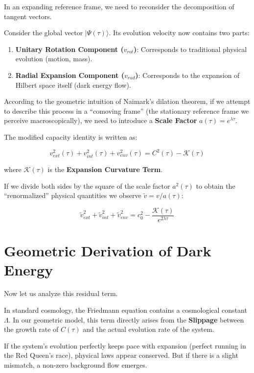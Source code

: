 In an expanding reference frame, we need to reconsider the decomposition of tangent vectors.

Consider the global vector $|\Psi(\tau)\rangle$. Its evolution velocity now contains two parts:

\begin{enumerate}
\item \textbf{Unitary Rotation Component ($v_{rot}$)}: Corresponds to traditional physical evolution (motion, mass).

\item \textbf{Radial Expansion Component ($v_{rad}$)}: Corresponds to the expansion of Hilbert space itself (dark energy flow).
\end{enumerate}

According to the geometric intuition of Naimark's dilation theorem, if we attempt to describe this process in a ``comoving frame'' (the stationary reference frame we perceive macroscopically), we need to introduce a \textbf{Scale Factor} $a(\tau) = e^{\lambda \tau}$.

The modified capacity identity is written as:

\[v_{ext}^2(\tau) + v_{int}^2(\tau) + v_{env}^2(\tau) = C^2(\tau) - \mathcal{K}(\tau)\]

where $\mathcal{K}(\tau)$ is the \textbf{Expansion Curvature Term}.

If we divide both sides by the square of the scale factor $a^2(\tau)$ to obtain the ``renormalized'' physical quantities we observe $\tilde{v} = v/a(\tau)$:

\[\tilde{v}_{ext}^2 + \tilde{v}_{int}^2 + \tilde{v}_{env}^2 = c_0^2 - \frac{\mathcal{K}(\tau)}{e^{2\lambda \tau}}\]

\section{Geometric Derivation of Dark Energy}

Now let us analyze this residual term.

In standard cosmology, the Friedmann equation contains a cosmological constant $\Lambda$. In our geometric model, this term directly arises from the \textbf{Slippage} between the growth rate of $C(\tau)$ and the actual evolution rate of the system.

If the system's evolution perfectly keeps pace with expansion (perfect running in the Red Queen's race), physical laws appear conserved. But if there is a slight mismatch, a non-zero background flow emerges.

